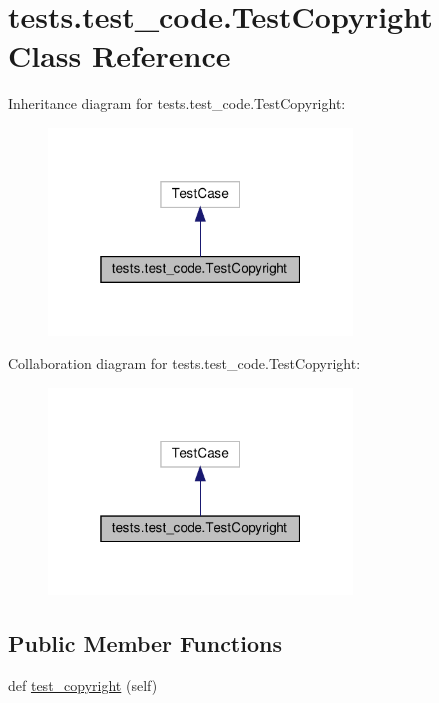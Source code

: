 \hypertarget{classtests_1_1test__code_1_1TestCopyright}{}\section{tests.\+test\+\_\+code.\+Test\+Copyright Class Reference}
\label{classtests_1_1test__code_1_1TestCopyright}


Inheritance diagram for tests.\+test\+\_\+code.\+Test\+Copyright\+:
\nopagebreak
\begin{figure}[H]
\begin{center}
\leavevmode
\includegraphics[width=229pt]{classtests_1_1test__code_1_1TestCopyright__inherit__graph}
\end{center}
\end{figure}


Collaboration diagram for tests.\+test\+\_\+code.\+Test\+Copyright\+:
\nopagebreak
\begin{figure}[H]
\begin{center}
\leavevmode
\includegraphics[width=229pt]{classtests_1_1test__code_1_1TestCopyright__coll__graph}
\end{center}
\end{figure}
\subsection*{Public Member Functions}
\begin{DoxyCompactItemize}
\item 
def \hyperlink{classtests_1_1test__code_1_1TestCopyright_a8c4a7409a6baf1ecd2b5be03b08ef56d}{test\+\_\+copyright} (self)
\end{DoxyCompactItemize}



